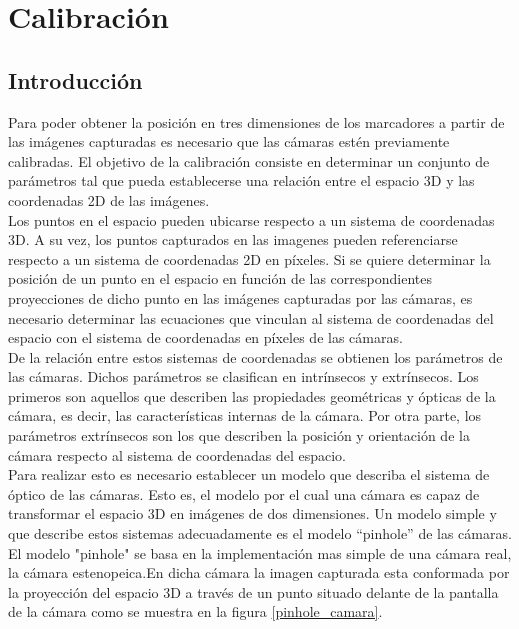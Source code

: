 


\section{Calibración}
\label{calibracion}

\subsection{Introducción}
Para poder obtener la posición en tres dimensiones de los marcadores a partir de las imágenes capturadas es necesario que las cámaras estén previamente calibradas. El objetivo de la calibración consiste en determinar un conjunto de parámetros tal que pueda establecerse una relación entre el espacio 3D y las coordenadas 2D de las imágenes.\\

Los puntos en el espacio pueden ubicarse respecto a un sistema de coordenadas 3D. A su vez, los puntos capturados en las imagenes pueden referenciarse respecto a un sistema de coordenadas 2D en píxeles. Si se quiere determinar la posición de un punto en el espacio en función de las correspondientes proyecciones de dicho punto en las imágenes capturadas por las cámaras, es necesario determinar las ecuaciones que vinculan al sistema de coordenadas del espacio con el sistema de coordenadas en píxeles de las cámaras.\\

De la relación entre estos sistemas de coordenadas se obtienen los parámetros de las cámaras. Dichos parámetros se clasifican en intrínsecos y extrínsecos. Los primeros son aquellos que describen las propiedades geométricas y ópticas de la cámara, es decir, las características internas de la cámara. Por otra parte, los parámetros extrínsecos son los que describen la posición y orientación de la cámara respecto al sistema de coordenadas del espacio.\\

Para realizar esto es necesario establecer un modelo que describa el sistema de óptico de las cámaras. Esto es, el modelo por el cual una cámara es capaz de transformar el espacio 3D en imágenes de dos dimensiones. Un modelo simple y que describe estos sistemas adecuadamente es el modelo “pinhole” de las cámaras. 
El modelo "pinhole" se basa en la implementación mas simple de una cámara real, la cámara estenopeica.En dicha cámara la imagen capturada esta conformada por la proyección del espacio 3D a través de un punto situado delante de la pantalla de la cámara como se muestra en la figura \ref{pinhole_camara}.\\

